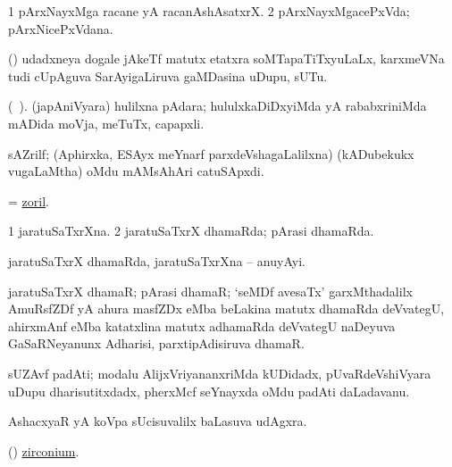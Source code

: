 \bentry
{} 
\gl{\nA} 
\bmng
\bnum
\num{1} pArxNayxMga racane yA racanAshAsatxrX. 
\num{2} pArxNayxMgacePxVda; pArxNicePxVdana.
\enum
\emng
\eentry

\bentry
{} 
\gl{\nA} 
\bmng
(\AmA) udadxneya dogale jAkeTf matutx etatxra soMTapaTiTxyuLaLx, karxmeVNa tudi cUpAguva SarAyigaLiruva gaMDasina uDupu, sUTu.
\emng
\eentry

\bentry
{} 
\gl{\nA}
\bmng
(\bava\ ). (japAniVyara) hulilxna pAdara; hululxkaDiDxyiMda yA rababxriniMda mADida moVja, meTuTx, capapxli. 
\emng
\eentry

\bentry
{} 
\gl{\nA} 
\bmng
sAZrilf; (Aphirxka, ESAyx meYnarf parxdeVshagaLalilxna) (kADubekukx \mo vugaLaMtha) oMdu mAMsAhAri catuSApxdi.
\emng
\eentry

\bentry
{} 
\gl{\nA}  
\bmng
= \hyperlink{zoril}{zoril}.
\emng
\eentry

\bentry
{} 
\gl{\gu} 
\bmng
\bnum
\num{1} jaratuSaTxrXna. 
\num{2} jaratuSaTxrX dhamaRda; pArasi dhamaRda.
\enum
\emng
\eentry

\bentry
{} 
\gl{\nA} 
\bmng
jaratuSaTxrX dhamaRda, jaratuSaTxrXna -- anuyAyi.
\emng
\eentry

\bentry
{}  
\gl{\nA} 
\bmng
jaratuSaTxrX dhamaR; pArasi dhamaR; `seMDf avesaTx' garxMthadalilx  AmuRsfZDf yA ahura masfZDx eMba beLakina matutx dhamaRda deVvategU, ahirxmAnf eMba katatxlina matutx adhamaRda deVvategU naDeyuva GaSaRNeyanunx Adharisi, parxtipAdisiruva dhamaR.
\emng
\eentry

\bentry
{} 
\gl{\nA} 
\bmng
sUZAvf padAti; modalu AlijxVriyananxriMda kUDidadx, pUvaRdeVshiVyara uDupu dharisutitxdadx, pherxMcf seYnayxda oMdu padAti daLadavanu. 
\emng
\eentry

\bentry
{} 
\gl{\BAavayx} 
\bmng
AshacxyaR yA koVpa sUcisuvalilx baLasuva udAgxra.
\emng
\eentry

\bentry
{} 
\gl{\saMkiSx} 
\bmng
{}
\emng
\eentry

\bentry
{}  
\gl{\saMkeV} 
\bmng
(\ravi) \hyperlink{zirconium}{zirconium}.
\emng
\eentry

